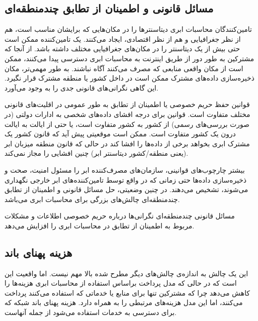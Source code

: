 \documentclass{book}
\begin{document}
    \subsection{مسائل قانونی و اطمینان از تطابق چندمنطقه‌ای}

        تامین‌کنندگان محاسبات ابری دیتاسنترها را در مکان‌هایی که برایشان مناسب است، هم از نظر جغرافیایی و هم از نظر اقتصادی، ایجاد می‌کنند. یک تامین‌کننده ممکن است حتی بیش از یک دیتاسنتر را در مکان‌های جغرافیایی مختلف داشته باشد. از آنجا که مشترکین به طور دور از طریق اینترنت به محاسبات ابری دسترسی پیدا می‌کنند، ممکن است از مکان واقعی منابعی که مصرف می‌کنند آگاه نباشند. به طور مهمی‌تر، مکان ذخیره‌سازی داده‌های مشترک ممکن است در داخل کشور یا منطقه مشترک قرار نگیرد. این گاهی نگرانی‌های قانونی جدی را به وجود می‌آورد.

        قوانین حفظ حریم خصوصی یا اطمینان از تطابق به طور عمومی در اقلیت‌های قانونی مختلف متفاوت است. قوانین برای درجه افشای داده‌های شخصی به ادارات دولتی (در صورت بررسی‌های رسمی) از کشور به کشور متفاوت است، یا حتی از ایالت به ایالت درون یک کشور متفاوت است. ممکن است موقعیتی پیش آید که قانون کشور یک مشترک ابری بخواهد برخی از داده‌ها را افشا کند در حالی که قانون منطقه میزبان ابر (یعنی منطقه/کشور دیتاسنتر ابر) چنین افشایی را مجاز نمی‌کند.

        بیشتر چارچوب‌های قوانینی، سازمان‌های مصرف‌کننده ابر را مسئول امنیت، صحت و ذخیره‌سازی داده‌ها حتی زمانی که در واقع توسط تامین‌کننده‌های ابر خارجی نگهداری می‌شوند، تشخیص می‌دهند. در چنین وضعیتی، حل مسائل قانونی و اطمینان از تطابق چندمنطقه‌ای چالش‌های بزرگی برای محاسبات ابری می‌باشد.
    
    \begin{addinfo}
        
        مسائل قانونی چندمنطقه‌ای نگرانی‌ها درباره حریم خصوصی اطلاعات و مشکلات مربوط به اطمینان از تطابق در محاسبات ابری را افزایش می‌دهد.
        
    \end{addinfo}

    \subsection{هزینه پهنای باند}

        این یک چالش به اندازه‌ی چالش‌های دیگر مطرح شده بالا مهم نیست. اما واقعیت این است که در حالی که مدل پرداخت براساس استفاده از محاسبات ابری هزینه‌ها را کاهش می‌دهد چرا که مشترکین تنها برای منابع یا خدماتی که استفاده می‌کنند پرداخت می‌کنند، اما این مدل هزینه‌های مرتبطی را به همراه دارد. هزینه پهنای باند شبکه که برای دسترسی به خدمات استفاده می‌شود از جمله آنهاست.
\end{document}
